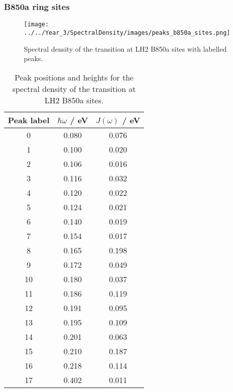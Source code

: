 \afterpartskip
\subsubsection{B850a ring sites}
\label{subsubsec:specdens_b850a}

\begin{figure}
    \centering
    \texttt{[image: ../../Year\_3/SpectralDensity/images/peaks\_b850a\_sites.png]}
    \caption{Spectral density of the \Qy transition at LH2 B850a sites with labelled
    peaks.}
    \label{fig:b850a_lablled_peaks}
\end{figure}

\begin{table}
    \centering
    \begin{tabular}{||c c c||}
    \hline
    Peak label & $\hbar \omega$ / eV & $J\left(\omega\right)$ / eV \\
    \hline\hline
    
     0 & 0.080 & 0.076 \\
     1 & 0.100 & 0.020 \\
     2 & 0.106 & 0.016 \\
     3 & 0.116 & 0.032 \\
     4 & 0.120 & 0.022 \\
     5 & 0.124 & 0.021 \\
     6 & 0.140 & 0.019 \\
     7 & 0.154 & 0.017 \\
     8 & 0.165 & 0.198 \\
     9 & 0.172 & 0.049 \\
     10 & 0.180 & 0.037 \\
     11 & 0.186 & 0.119 \\
     12 & 0.191 & 0.095 \\
     13 & 0.195 & 0.109 \\
     14 & 0.201 & 0.063 \\
     15 & 0.210 & 0.187 \\
     16 & 0.218 & 0.114 \\
     17 & 0.402 & 0.011 \\
    \hline 
    \end{tabular}
    \caption{Peak positions and heights for the spectral density of the \Qy transition 
    at LH2 B850a sites.}
    \label{tab:b850a_lablled_peaks}
\end{table}


\afterpartskip
